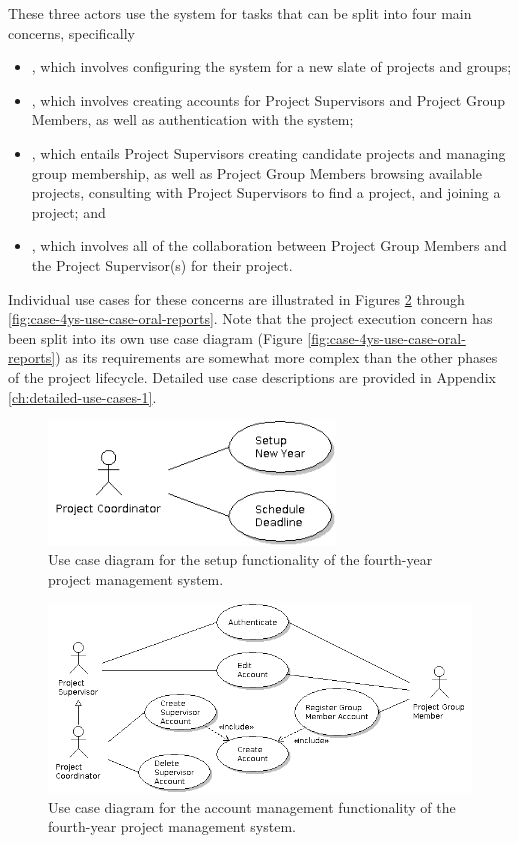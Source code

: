 \documentclass[document.tex]{subfiles}
\begin{document}
These three actors use the system for tasks that can be split into four main concerns, specifically
\begin{itemize}
\item {}, which involves configuring the system for a new slate of projects and groups;
\item {}, which involves creating accounts for Project Supervisors and Project Group Members, as well as authentication with the system;
\item {}, which entails Project Supervisors creating candidate projects and managing group membership, as well as Project Group Members browsing available projects, consulting with Project Supervisors to find a project, and joining a project; and
\item {}, which involves all of the collaboration between Project Group Members and the Project Supervisor(s) for their project.
\end{itemize}

Individual use cases for these concerns are illustrated in Figures \ref{fig:case-4ys-use-case-account-management} through \ref{fig:case-4ys-use-case-oral-reports}. Note that the project execution concern has been split into its own use case diagram (Figure \ref{fig:case-4ys-use-case-oral-reports}) as its requirements are somewhat more complex than the other phases of the project lifecycle.
Detailed use case descriptions are provided in Appendix \ref{ch:detailed-use-cases-1}.

\begin{figure}[!ht]
\centering \includegraphics[width=3in]{./img/case-study-fourth-year-system/setup}
\caption{Use case diagram for the setup functionality of the fourth-year project management system.}
\label{fig:case-4ys-use-case-account-management}
\end{figure}

\begin{figure}[!ht]
\centering \includegraphics[width=6in]{./img/case-study-fourth-year-system/account-management}
\caption{Use case diagram for the account management functionality of the fourth-year project management system.}
\label{fig:case-4ys-use-case-account-management}
\end{figure}
\end{document}
